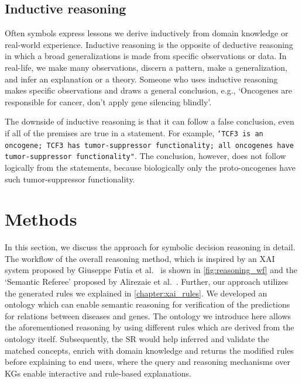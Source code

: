 \subsection{Inductive reasoning} 
Often symbols express lessons we derive inductively from domain knowledge or real-world experience. Inductive reasoning is the opposite of deductive reasoning in which a broad generalizations is made from specific observations or data. In real-life, we make many observations, discern a pattern, make a generalization, and infer an explanation or a theory. Someone who uses inductive reasoning makes specific observations and draws a general conclusion, e.g., `Oncogenes are responsible for cancer, don't apply gene silencing blindly'. 

The downside of inductive reasoning is that it can follow a false conclusion, even if all of the premises are true in a statement. For example, \texttt{`TCF3 is an oncogene; TCF3 has tumor-suppressor functionality; all oncogenes have tumor-suppressor functionality"}. The conclusion, however, does not follow logically from the statements, because biologically only the proto-oncogenes have such tumor-suppressor functionality.

\section{Methods}\label{chapter_8:mm}
In this section, we discuss the approach for symbolic decision reasoning in detail. The workflow of the overall reasoning method, which is inspired by an XAI system proposed by Giuseppe Futia et al.~\cite{futia2020integration} is shown in \cref{fig:reasoning_wf} and the `Semantic Referee' proposed by Alirezaie et al.~\cite{alirezaie2019semantic}. Further, our approach utilizes the generated rules we explained in \cref{chapter:xai_rules}. We developed an ontology which can enable semantic reasoning for verification of the predictions for relations between diseases and genes. The ontology we introduce here allows the aforementioned reasoning by using different rules which are derived from the ontology itself. Subsequently, the SR would help inferred and validate the matched concepts, enrich with domain knowledge and returns the modified rules before explaining to end users, where the query and reasoning mechanisms over KGs enable interactive and rule-based explanations. 

